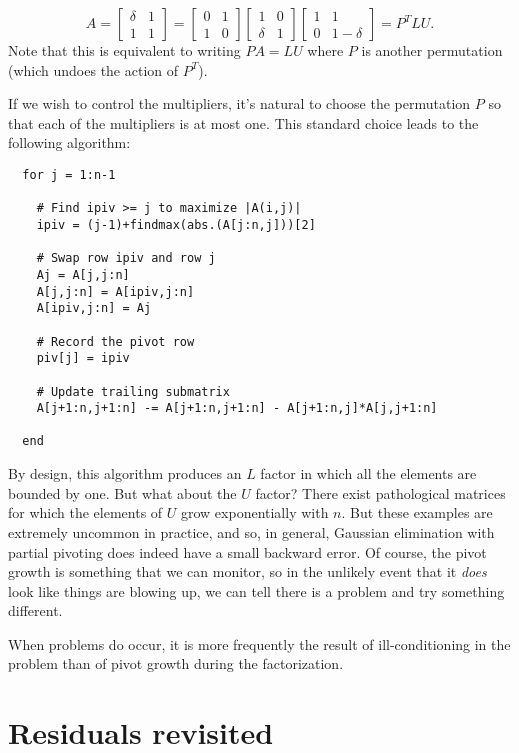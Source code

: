 \documentclass[12pt, leqno]{article}
\begin{document}
\[
  A = \begin{bmatrix} \delta & 1 \\ 1 & 1 \end{bmatrix} =
      \begin{bmatrix} 0 & 1 \\ 1 & 0 \end{bmatrix}
      \begin{bmatrix} 1 & 0 \\ \delta & 1 \end{bmatrix}
      \begin{bmatrix} 1 & 1 \\ 0 & 1-\delta \end{bmatrix}
    = P^T LU.
\]
Note that this is equivalent to writing $P A = LU$ where $P$
is another permutation (which undoes the action of $P^T$).

If we wish to control the multipliers, it's natural to choose
the permutation $P$ so that each of the multipliers is at most one.
This standard choice leads to the following algorithm:
\begin{lstlisting}
  for j = 1:n-1

    # Find ipiv >= j to maximize |A(i,j)|
    ipiv = (j-1)+findmax(abs.(A[j:n,j]))[2]

    # Swap row ipiv and row j
    Aj = A[j,j:n]
    A[j,j:n] = A[ipiv,j:n]
    A[ipiv,j:n] = Aj

    # Record the pivot row
    piv[j] = ipiv

    # Update trailing submatrix
    A[j+1:n,j+1:n] -= A[j+1:n,j+1:n] - A[j+1:n,j]*A[j,j+1:n]

  end
\end{lstlisting}

By design, this algorithm produces an $L$ factor in which all the
elements are bounded by one.  But what about the $U$ factor?  There
exist pathological matrices for which the elements of $U$ grow
exponentially with $n$.  But these examples are extremely uncommon in
practice, and so, in general, Gaussian elimination with partial
pivoting does indeed have a small backward error.  Of course, the
pivot growth is something that we can monitor, so in the unlikely event
that it {\em does} look like things are blowing up, we can tell there
is a problem and try something different.

When problems do occur, it is more frequently the result of
ill-conditioning in the problem than of pivot growth during the
factorization.

\section{Residuals revisited}
\end{document}
